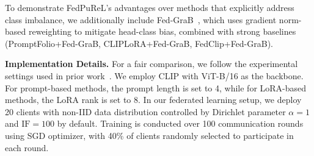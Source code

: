 \documentclass[10pt,twocolumn,letterpaper]{article}
\begin{document}
To demonstrate FedPuReL's advantages over methods that explicitly address class imbalance, we additionally include Fed-GraB~\cite{Fed-Grab}, which uses gradient norm-based reweighting to mitigate head-class bias, combined with strong baselines (PromptFolio+Fed-GraB, CLIPLoRA+Fed-GraB, FedClip+Fed-GraB).









\noindent \textbf{Implementation Details.}
For a fair comparison, we follow the experimental settings used in prior work~\cite{guo2023promptfl,li2024fedotp,pan2024promptfolio,lu2023fedclip}. We employ CLIP with ViT-B/16 as the backbone. For prompt-based methods, the prompt length is set to 4, while for LoRA-based methods, the LoRA rank is set to 8. In our federated learning setup, we deploy 20 clients with non-IID data distribution controlled by Dirichlet parameter $\alpha=1$ and $\text{IF}=100$ by default. Training is conducted over 100 communication rounds using SGD optimizer, with 40\% of clients randomly selected to participate in each round.
\end{document}
